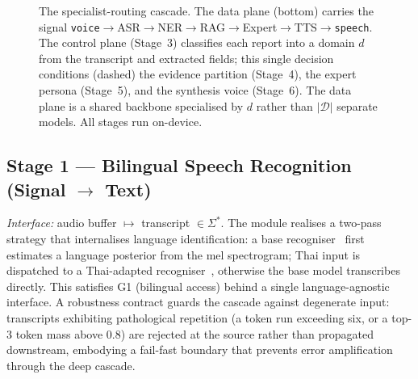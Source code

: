 \documentclass[runningheads]{llncs}
\begin{document}
\begin{figure}[t]
{%
}
\caption{The specialist-routing cascade. The data plane (bottom) carries the signal
\texttt{voice}$\rightarrow$ASR$\rightarrow$NER$\rightarrow$RAG$\rightarrow$Expert$\rightarrow$TTS$\rightarrow$\texttt{speech}.
The control plane (Stage~3) classifies each report into a domain $d$ from the transcript
and extracted fields; this single decision conditions (dashed) the evidence partition
(Stage~4), the expert persona (Stage~5), and the synthesis voice (Stage~6). The data
plane is a shared backbone specialised by $d$ rather than $|\mathcal{D}|$ separate
models. All stages run on-device.}
\label{fig:pipeline}
\end{figure}

\subsection{Stage 1 --- Bilingual Speech Recognition (Signal $\rightarrow$ Text)}

\emph{Interface:} audio buffer $\mapsto$ transcript $\in \Sigma^{*}$.
The module realises a two-pass strategy that internalises language identification: a base recogniser~\cite{radford2023} first estimates a language posterior from the mel spectrogram; Thai input is dispatched to a Thai-adapted recogniser~\cite{pathumma}, otherwise the base model transcribes directly. This satisfies G1 (bilingual access) behind a single language-agnostic interface. A robustness contract guards the cascade against degenerate input: transcripts exhibiting pathological repetition (a token run exceeding six, or a top-3 token mass above 0.8) are rejected at the source rather than propagated downstream, embodying a fail-fast boundary that prevents error amplification through the deep cascade.
\end{document}
